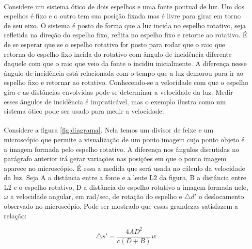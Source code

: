 \documentclass[a4paper,11pt]{article}
\begin{document}
\paragraph{}Considere um sistema ótico de dois espelhos e
uma fonte pontual de luz. Um dos espelhos é fixo e o outro
tem sua posição fixada mas é livre para girar em torno de
seu eixo. O sistema é posto de forma que a luz incida no
espelho rotativo, seja refletida na direção do espelho
fixo, reflita no espelho fixo e retorne ao rotativo. É de se
esperar que se o espelho rotativo for posto para rodar que o
raio que retorna do espelho fixo incida do rotativo com
ângulo de incidência diferente daquele com que o raio que
veio da fonte o incidiu inicialmente. A diferença nesse
ângulo de incidência está relacionada com o tempo que a luz
demorou para ir ao espelho fixo e retornar ao rotativo.
Conhecendo-se a velocidade com que o espelho gira e as
distâncias envolvidas pode-se determinar a velocidade da
luz. Medir esses ângulos de incidência é impraticável, mas o
exemplo ilustra como um sistema ótico pode ser usado para
medir a velocidade.

\paragraph{} Considere a figura \ref{fig:diagrama}. Nela
temos um divisor de feixe e um microscópio que permite a
visualização de um ponto imagem cujo ponto objeto é a imagem
formada pelo espelho rotativo. A diferença nos ângulos
discutidas no parágrafo anterior irá gerar variações nas
posições em que o ponto imagem aparece no microscópio. É
essa a medida que será usada no cálculo da velocidade da
luz. Seja A a distância entre a fonte e a lente L2 da
figura, B a distância entre L2 e o espelho rotativo, D a
distância do espelho rotativo a imagem formada nele,
$\omega$ a velocidade angular, em rad/sec, de rotação do
espelho e $\triangle d'$ o deslocamento observado no
microscópio. Pode ser mostrado que essas grandezas satisfazem a
relação:

\begin{equation}
  \triangle s' = \frac{4AD^2}{c(D+B)}w
  \label{eq:LeEquation}
\end{equation}
\end{document}

